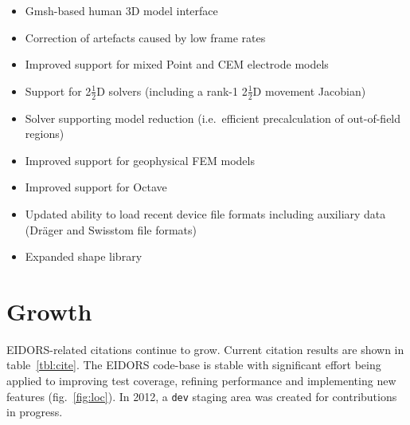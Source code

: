 \documentclass[10pt,letterpaper]{article}
\begin{document}
\begin{multicols}{2}
\begin{itemize}
\item Gmsh-based human 3D model interface \cite{grychtol2016}

\item Correction of artefacts caused by low frame rates \cite{yerworth2016}

\item Improved support for mixed Point and CEM electrode models


\item Support for 2$\frac{1}{2}$D solvers (including a rank-1 2$\frac{1}{2}$D movement Jacobian)
   \cite{boyle2016model2p5}

\item Solver supporting model reduction (i.e.\ efficient precalculation of
       out-of-field regions) \cite{adler2016model}



\item Improved support for geophysical FEM models


\item Improved support for Octave

\item Updated ability to load recent device file formats including
       auxiliary data (Dr\"ager and Swisstom file formats)




\item Expanded shape library
\end{itemize}

\section{Growth}
EIDORS-related citations continue to grow. Current citation results are
shown in table~\ref{tbl:cite}.
%
The EIDORS code-base is stable with significant effort being applied to
improving test coverage, refining performance and implementing new features
(fig.~\ref{fig:loc}). In 2012, a {\tt dev} staging area was created for
contributions in progress.


\end{multicols}
\end{document}
